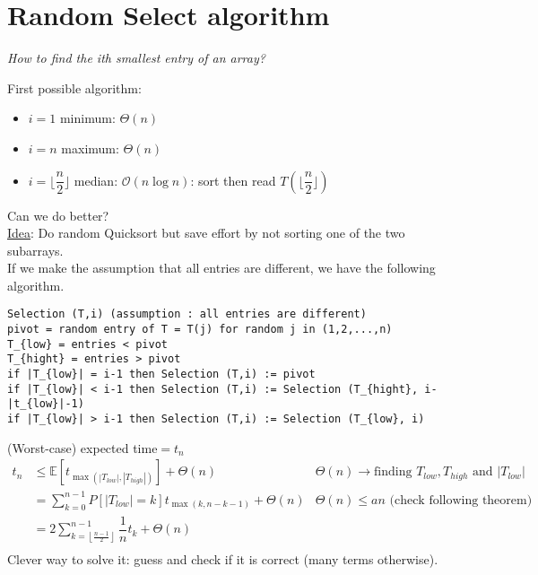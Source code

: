 \section{Random Select algorithm}
\textit{How to find the ith smallest entry of an array?}
\begin{example}
\begin{leftbar}
First possible algorithm:
\begin{itemize}
\item $i=1$   minimum: $\Theta(n)$
\item $i=n$   maximum: $\Theta(n)$
\item $i=\lfloor \dfrac{n}{2}\rfloor$ median: $\mathcal{O}(n\log n)$: sort then read $T(\lfloor \dfrac{n}{2}\rfloor)$
\end{itemize}
\end{leftbar}
\end{example}

Can we do better?\\
\underline{Idea}: Do random Quicksort but save effort by not sorting one of the two subarrays.\\

If we make the assumption that all entries are different, we have the following algorithm.

\begin{lstlisting}[label={list:c3:select},caption={Selection (T,i)}]
Selection (T,i) (assumption : all entries are different)
pivot = random entry of T = T(j) for random j in (1,2,...,n)
T_{low} = entries < pivot
T_{hight} = entries > pivot
if |T_{low}| = i-1 then Selection (T,i) := pivot
if |T_{low}| < i-1 then Selection (T,i) := Selection (T_{hight}, i-|t_{low}|-1)
if |T_{low}| > i-1 then Selection (T,i) := Selection (T_{low}, i)
\end{lstlisting}

(Worst-case) expected time$=t_n$
\begin{align*}
t_n &\leq \mathbb{E}[t_{\max(|T_{low}|,|T_{high}|)}]+\Theta (n) & \Theta (n)\rightarrow \text{finding }T_{low},T_{high}\text{ and }|T_{low}|\\
&=\sum\limits_{k=0}^{n-1}P[|T_{low}|=k]t_{\max(k,n-k-1)}+\Theta (n) & \Theta (n)\leq an \text{ (check following theorem)}\\
&=2\sum\limits_{k=\left\lfloor \frac{n-1}{2}\right\rfloor}^{n-1}\dfrac{1}{n}t_k+\Theta (n)&\\
\end{align*}
Clever way to solve it: guess and check if it is correct (many terms otherwise).\\

